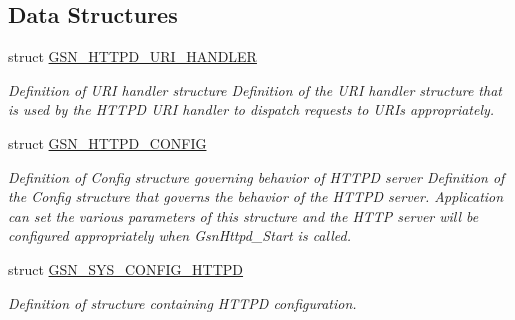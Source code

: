 \subsection*{Data Structures}
\begin{DoxyCompactItemize}
\item 
struct \hyperlink{a00097}{GSN\_\-HTTPD\_\-URI\_\-HANDLER}
\begin{DoxyCompactList}\small\item\em Definition of URI handler structure Definition of the URI handler structure that is used by the HTTPD URI handler to dispatch requests to URIs appropriately. \end{DoxyCompactList}\item 
struct \hyperlink{a00095}{GSN\_\-HTTPD\_\-CONFIG}
\begin{DoxyCompactList}\small\item\em Definition of Config structure governing behavior of HTTPD server Definition of the Config structure that governs the behavior of the HTTPD server. Application can set the various parameters of this structure and the HTTP server will be configured appropriately when GsnHttpd\_\-Start is called. \end{DoxyCompactList}\item 
struct \hyperlink{a00246}{GSN\_\-SYS\_\-CONFIG\_\-HTTPD}
\begin{DoxyCompactList}\small\item\em Definition of structure containing HTTPD configuration. \end{DoxyCompactList}\end{DoxyCompactItemize}
